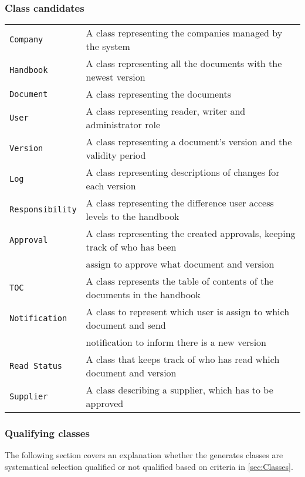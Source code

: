 \subsubsection{Class candidates} 
\begin{tabular}{l l}
	\texttt{Company} & A class representing the companies managed by the system \\
	\texttt{Handbook} & A class representing all the documents with the newest version\\
	\texttt{Document} & A class representing the documents\\
	\texttt{User }& A class representing reader, writer and administrator role\\
	\texttt{Version} & A class representing a document’s version and the validity period\\
	\texttt{Log} & A class representing descriptions of changes for each version\\ 
	\texttt{Responsibility} & A class representing the difference user access levels to the handbook\\ 
	\texttt{Approval} & A class representing the created approvals, keeping track of who has been\\&assign to approve what document and version\\ 
	\texttt{TOC} & A class represents the table of contents of the documents in the handbook\\
	\texttt{Notification} & A class to represent which user is assign to which document and send\\&notification to inform there is a new version\\ 
	\texttt{Read Status} & A class that keeps track of who has read which document and version\\
	\texttt{Supplier} & A class describing a supplier, which has to be approved 
\end{tabular}


\subsubsection{Qualifying classes}
The following section covers an explanation whether the generates classes are systematical selection qualified or not qualified based on criteria in \cref{sec:Classes}.


